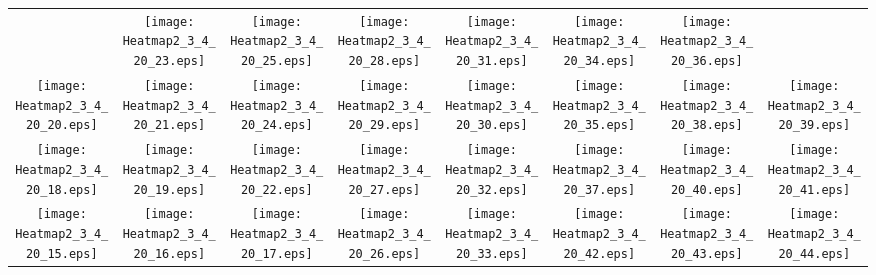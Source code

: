 \documentclass{standalone}
\begin{document}
\renewcommand{\arraystretch}{0}
\setlength{\tabcolsep}{0pt}
\begin{tabular}{ *8{c} }
 & \texttt{[image: Heatmap2\_3\_4\_20\_23.eps]} & \texttt{[image: Heatmap2\_3\_4\_20\_25.eps]} & \texttt{[image: Heatmap2\_3\_4\_20\_28.eps]} & \texttt{[image: Heatmap2\_3\_4\_20\_31.eps]} & \texttt{[image: Heatmap2\_3\_4\_20\_34.eps]} & \texttt{[image: Heatmap2\_3\_4\_20\_36.eps]} &  \\
\texttt{[image: Heatmap2\_3\_4\_20\_20.eps]} & \texttt{[image: Heatmap2\_3\_4\_20\_21.eps]} & \texttt{[image: Heatmap2\_3\_4\_20\_24.eps]} & \texttt{[image: Heatmap2\_3\_4\_20\_29.eps]} & \texttt{[image: Heatmap2\_3\_4\_20\_30.eps]} & \texttt{[image: Heatmap2\_3\_4\_20\_35.eps]} & \texttt{[image: Heatmap2\_3\_4\_20\_38.eps]} & \texttt{[image: Heatmap2\_3\_4\_20\_39.eps]} \\
\texttt{[image: Heatmap2\_3\_4\_20\_18.eps]} & \texttt{[image: Heatmap2\_3\_4\_20\_19.eps]} & \texttt{[image: Heatmap2\_3\_4\_20\_22.eps]} & \texttt{[image: Heatmap2\_3\_4\_20\_27.eps]} & \texttt{[image: Heatmap2\_3\_4\_20\_32.eps]} & \texttt{[image: Heatmap2\_3\_4\_20\_37.eps]} & \texttt{[image: Heatmap2\_3\_4\_20\_40.eps]} & \texttt{[image: Heatmap2\_3\_4\_20\_41.eps]} \\
\texttt{[image: Heatmap2\_3\_4\_20\_15.eps]} & \texttt{[image: Heatmap2\_3\_4\_20\_16.eps]} & \texttt{[image: Heatmap2\_3\_4\_20\_17.eps]} & \texttt{[image: Heatmap2\_3\_4\_20\_26.eps]} & \texttt{[image: Heatmap2\_3\_4\_20\_33.eps]} & \texttt{[image: Heatmap2\_3\_4\_20\_42.eps]} & \texttt{[image: Heatmap2\_3\_4\_20\_43.eps]} & \texttt{[image: Heatmap2\_3\_4\_20\_44.eps]} \\

\end{tabular}
\end{document}
